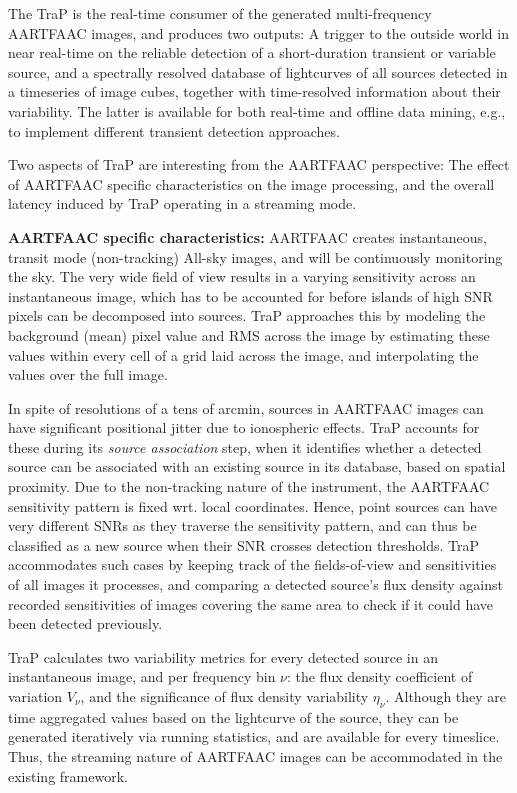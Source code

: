 \documentclass{ws-jai}
\begin{document}
The TraP  is the  real-time consumer of  the generated  multi-frequency AARTFAAC
images,  and produces  two  outputs: A  trigger  to the  outside  world in  near
real-time on  the reliable detection  of a short-duration transient  or variable
source,  and  a spectrally  resolved  database  of  lightcurves of  all  sources
detected in a timeseries of image cubes, together with time-resolved information
about their variability.  The latter is available for both real-time and offline
data mining, e.g., to implement different transient detection approaches.

Two aspects of TraP are interesting from the AARTFAAC perspective: The effect of
AARTFAAC  specific characteristics  on  the image  processing,  and the  overall
latency induced by TraP operating in a streaming mode.

\noindent   \textbf  {AARTFAAC   specific  characteristics:}   AARTFAAC  creates
instantaneous,  transit   mode  (non-tracking)  All-sky  images,   and  will  be
continuously  monitoring the  sky. The  very  wide field  of view  results in  a
varying sensitivity across an instantaneous image, which has to be accounted for
before  islands  of high  SNR  pixels  can  be  decomposed into  sources.   TraP
approaches this by modeling the background (mean) pixel value and RMS across the
image by  estimating these values  within every cell of  a grid laid  across the
image, and interpolating the values over  the full image.

In spite of resolutions of a tens of arcmin, sources in AARTFAAC images can have
significant positional  jitter due  to ionospheric  effects.  TraP  accounts for
these during its \textit{source association}  step, when it identifies whether a
detected source can be associated with an existing source in its database, based
on spatial  proximity.  Due to  the non-tracking  nature of the  instrument, the
AARTFAAC  sensitivity pattern  is fixed  wrt.  local  coordinates. Hence,  point
sources can have  very different SNRs as they traverse  the sensitivity pattern,
and can  thus be  classified as a  new source when  their SNR  crosses detection
thresholds. TraP accommodates such cases  by keeping track of the fields-of-view
and sensitivities of all images it  processes, and comparing a detected source's
flux density against recorded sensitivities of  images covering the same area to
check if it could have been detected previously.

TraP  calculates  two  variability  metrics  for every  detected  source  in  an
instantaneous image, and  per frequency bin $\nu$: the  flux density coefficient
of  variation  $V_{\nu}$,  and  the significance  of  flux  density  variability
$\eta_{\nu}$. Although they  are time aggregated values based  on the lightcurve
of the source, they can be generated iteratively via running statistics, and are
available for  every timeslice.  Thus,  the streaming nature of  AARTFAAC images
can be accommodated in the existing framework.
\end{document}
